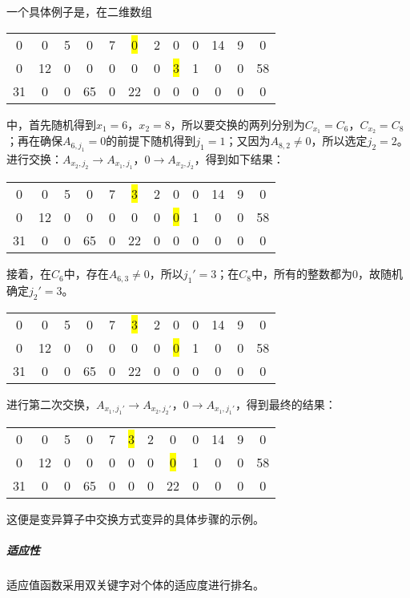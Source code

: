 \documentclass[UTF8,cs4size]{ctexart}
\begin{document}
\begin{enumerate}
一个具体例子是，在二维数组
\begin{center}
\begin{tabular}{cccccccccccc}
0 & 0 & 5 & 0 & 7 & \colorbox{yellow}{0} & 2 & 0 & 0 & 14 & 9 & 0 \\
0 & 12 & 0 & 0 & 0 & 0 & 0 & \colorbox{yellow}{3} & 1 & 0 & 0 & 58 \\
31 & 0 & 0 & 65 & 0 & 22 & 0 & 0 & 0 & 0 & 0 & 0
\end{tabular}
\end{center}
中，首先随机得到$x_1=6$，$x_2=8$，所以要交换的两列分别为$C_{x_1}=C_6$，$C_{x_2}=C_8$；再在确保$A_{6,j_1} = 0$的前提下随机得到$j_1=1$；又因为$A_{8,2} \neq 0$，所以选定$j_2=2$。进行交换：$A_{x_2,j_2} \to A_{x_1,j_1}$，$0 \to A_{x_2,j_2}$，得到如下结果：
\begin{center}
\begin{tabular}{cccccccccccc}
0 & 0 & 5 & 0 & 7 & \colorbox{yellow}{3} & 2 & 0 & 0 & 14 & 9 & 0 \\
0 & 12 & 0 & 0 & 0 & 0 & 0 & \colorbox{yellow}{0} & 1 & 0 & 0 & 58 \\
31 & 0 & 0 & 65 & 0 & 22 & 0 & 0 & 0 & 0 & 0 & 0
\end{tabular}
\end{center}
接着，在$C_6$中，存在$A_{6,3} \neq 0$，所以$j_1'=3$；在$C_8$中，所有的整数都为0，故随机确定$j_2' = 3$。
\begin{center}
\begin{tabular}{cccccccccccc}
0 & 0 & 5 & 0 & 7 & \colorbox{yellow}{3} & 2 & 0 & 0 & 14 & 9 & 0 \\
0 & 12 & 0 & 0 & 0 & 0 & 0 & \colorbox{yellow}{0} & 1 & 0 & 0 & 58 \\
31 & 0 & 0 & 65 & 0 & \colorbox{green!50}{22} & 0 & \colorbox{green!50}{0} & 0 & 0 & 0 & 0
\end{tabular}
\end{center}
进行第二次交换，$A_{x_1,j_1'} \to A_{x_2,j_2'}$，$0 \to A_{x_1,j_1'}$，得到最终的结果：
\begin{center}
\begin{tabular}{cccccccccccc}
0 & 0 & 5 & 0 & 7 & \colorbox{yellow}{3} & 2 & 0 & 0 & 14 & 9 & 0 \\
0 & 12 & 0 & 0 & 0 & 0 & 0 & \colorbox{yellow}{0} & 1 & 0 & 0 & 58 \\
31 & 0 & 0 & 65 & 0 & \colorbox{green!50}{0} & 0 & \colorbox{green!50}{22} & 0 & 0 & 0 & 0
\end{tabular}
\end{center}
这便是变异算子中交换方式变异的具体步骤的示例。
\end{enumerate}
\subparagraph{适应性}
适应值函数采用双关键字对个体的适应度进行排名。
\end{document}
